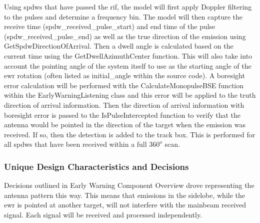 \unclass Using \gls{spdw}s that have passed the \gls{rif}, the model will first apply Doppler filtering to the pulses and determine a frequency bin. The model will then capture the receive time (spdw\_received\_pulse\_start) and end time of the pulse (spdw\_received\_pulse\_end) as well as the true direction of the emission using GetSpdwDirectionOfArrival. Then a dwell angle is calculated based on the current time using the GetDwellAzimuthCenter function. This will also take into account the pointing angle of the system itself to use as the starting angle of the \gls{ewr} rotation (often listed as initial\_angle within the source code). A boresight error calculation will be performed with the CalculateMonopulseBSE function within the EarlyWarningListening class and this error will be applied to the truth direction of arrival information. Then the direction of arrival information with boresight error is passed to the IsPulseIntercepted function to verify that the antenna would be pointed in the direction of the target when the emission was received. If so, then the detection is added to the track box. This is performed for all \gls{spdw}s that have been received within a full $360^o$ scan.


\subsubsection{\unclass \componentname Unique Design Characteristics and Decisions}
\unclass Decisions outlined in Early Warning Component Overview drove representing the antenna pattern this way. This means that emissions in the sidelobe, while the \gls{ewr} is pointed at another target, will not interfere with the mainbeam received signal. Each signal will be received and processed independently.


